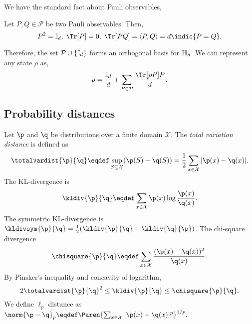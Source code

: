 We have the standard fact about Pauli observables,
\begin{fact}
\label{fact:pauli}
    Let $P, Q\in \mathcal{P}$ be two Pauli observables. Then, 
\[
P^2=\eye_\dims, \;\Tr[P]=0,\; \Tr[PQ]=\hdotprod{P}{Q}=\dims\indic{P=Q}.
\]
\end{fact}
Therefore, the set ${\mathcal{P}}\cup \{\mathbb{I}_d\}$ forms an orthogonal basis for ${\mathbb{H}_{d}}$. We can represent any state $\rho$ as,
\begin{equation}
    \rho = \frac{\eye_\dims}{\dims}+\sum_{P\in \pauliObsSet}\frac{\Tr[\rho P]P}{\dims}.
    \label{equ:state-pauli}
\end{equation}
\subsection{Probability distances}
Let $\p$ and $\q$ be distributions over a finite domain $\mathcal{X}$. The \emph{total variation distance} is defined as 
\[
\totalvardist{\p}{\q}\eqdef\sup_{S\subseteq\mathcal{X}}(\p(S)-\q(S))=\frac{1}{2}\sum_{x\in\mathcal{X}}|\p(x)-\q(x)|.
\]
The KL-divergence  is
\[
\kldiv{\p}{\q}\eqdef\sum_{x\in\mathcal{X}}\p(x)\log\frac{\p(x)}{\q(x)}.
\]
The symmetric KL-divergence is 
$\kldivsym{\p}{\q}=\frac{1}{2}(\kldiv{\p}{\q}+\kldiv{\q}{\p})$. The chi-square divergence
\[
\chisquare{\p}{\q}\eqdef \sum_{x\in\mathcal{X}}\frac{(\p(x)-\q(x))^2}{\q(x)}.
\]
By Pinsker's inequality and concavity of logarithm,
\[
2\totalvardist{\p}{\q}^2\le \kldiv{\p}{\q}\le \chisquare{\p}{\q}.
\]
We define $\ell_p$ distance as $
\norm{\p-\q}_p\eqdef\Paren{\sum_{x\in\mathcal{X}}{|\p(x)-\q(x)|^p}}^{1/p}.
$




